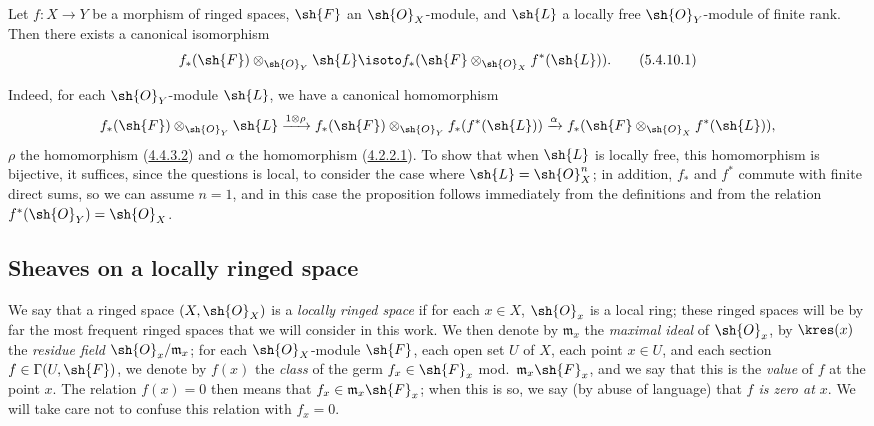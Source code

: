 \begin{env}[5.4.10]
\label{0.5.4.10}
Let $f:X\to Y$ be a morphism of ringed spaces, $\sh{F}$ an $\sh{O}_X$-module, and $\sh{L}$ a locally free $\sh{O}_Y$-module of finite rank.
Then there exists a canonical isomorphism
\[
  f_*(\sh{F})\otimes_{\sh{O}_Y}\sh{L}\isoto f_*(\sh{F}\otimes_{\sh{O}_X}f^*(\sh{L})).
  \tag{5.4.10.1}
\]

Indeed, for each $\sh{O}_Y$-module $\sh{L}$, we have a canonical homomorphism
\[
  f_*(\sh{F})\otimes_{\sh{O}_Y}\sh{L}\xrightarrow{1\otimes\rho}f_*(\sh{F})\otimes_{\sh{O}_Y}f_*(f^*(\sh{L}))\xrightarrow{\alpha}f_*(\sh{F}\otimes_{\sh{O}_X}f^*(\sh{L})),
\]
$\rho$ the homomorphism (\hyperref[0.4.4.3.2]{4.4.3.2}) and $\alpha$ the homomorphism (\hyperref[0.4.2.2.1]{4.2.2.1}).
To show that when $\sh{L}$ is locally free, this homomorphism is bijective, it suffices, since the questions is local, to consider the case where $\sh{L}=\sh{O}_X^n$;
in addition, $f_*$ and $f^*$ commute with finite direct sums, so we can assume $n=1$, and in this case the proposition follows immediately from the definitions and from the relation $f^*(\sh{O}_Y)=\sh{O}_X$.
\end{env}

\subsection{Sheaves on a locally ringed space}
\label{subsection:0.5.5}

\begin{env}[5.5.1]
\label{0.5.5.1}
We say that a ringed space $(X,\sh{O}_X)$ is a \emph{locally ringed space} if for each $x\in X$, $\sh{O}_x$ is a local ring;
these ringed spaces will be by far the most frequent ringed spaces that we will consider in this work.
We then denote by $\mathfrak{m}_x$ the \emph{maximal ideal} of $\sh{O}_x$, by $\kres(x)$ the \emph{residue field $\sh{O}_x/\mathfrak{m}_x$};
for each $\sh{O}_X$-module $\sh{F}$, each open set $U$ of $X$, each point $x\in U$, and each section $f\in\Gamma(U,\sh{F})$, we denote by $f(x)$ the \emph{class} of the germ $f_x\in\sh{F}_x$ mod.~$\mathfrak{m}_x\sh{F}_x$, and we say that this is the \emph{value} of $f$ at the point $x$.
The relation $f(x)=0$ then means that $f_x\in\mathfrak{m}_x\sh{F}_x$; when this is so, we say (by abuse of language) that \emph{$f$ is zero at $x$}.
We will take care not to confuse this relation with $f_x=0$.
\end{env}


